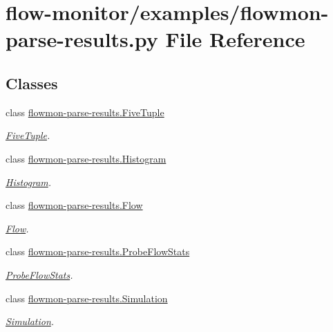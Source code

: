 \hypertarget{flowmon-parse-results_8py}{}\section{flow-\/monitor/examples/flowmon-\/parse-\/results.py File Reference}
\label{flowmon-parse-results_8py}
\subsection*{Classes}
\begin{DoxyCompactItemize}
\item 
class \hyperlink{classflowmon-parse-results_1_1FiveTuple}{flowmon-\/parse-\/results.\+Five\+Tuple}
\begin{DoxyCompactList}\small\item\em \hyperlink{classflowmon-parse-results_1_1FiveTuple}{Five\+Tuple}. \end{DoxyCompactList}\item 
class \hyperlink{classflowmon-parse-results_1_1Histogram}{flowmon-\/parse-\/results.\+Histogram}
\begin{DoxyCompactList}\small\item\em \hyperlink{classflowmon-parse-results_1_1Histogram}{Histogram}. \end{DoxyCompactList}\item 
class \hyperlink{classflowmon-parse-results_1_1Flow}{flowmon-\/parse-\/results.\+Flow}
\begin{DoxyCompactList}\small\item\em \hyperlink{classflowmon-parse-results_1_1Flow}{Flow}. \end{DoxyCompactList}\item 
class \hyperlink{classflowmon-parse-results_1_1ProbeFlowStats}{flowmon-\/parse-\/results.\+Probe\+Flow\+Stats}
\begin{DoxyCompactList}\small\item\em \hyperlink{classflowmon-parse-results_1_1ProbeFlowStats}{Probe\+Flow\+Stats}. \end{DoxyCompactList}\item 
class \hyperlink{classflowmon-parse-results_1_1Simulation}{flowmon-\/parse-\/results.\+Simulation}
\begin{DoxyCompactList}\small\item\em \hyperlink{classflowmon-parse-results_1_1Simulation}{Simulation}. \end{DoxyCompactList}\end{DoxyCompactItemize}
